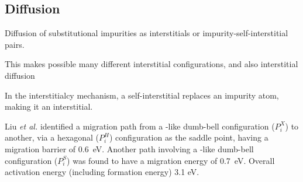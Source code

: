\documentclass[11pt,bibliography=totoc,index=totoc]{scrbook}   %
\begin{document}






%
\subsection{Diffusion}\label{sec:PDiffusion}
%

Diffusion of substitutional impurities as interstitials or impurity-self-interstitial pairs.

This makes possible many different interstitial configurations, and also interstitial diffusion

In the interstitialcy mechanism, a self-interstitial  replaces an impurity atom, making it an interstitial.

Liu \textit{et al.} identified a migration path from a -like dumb-bell configuration ($P_i^X$) to another, via a hexagonal ($P_i^H$) configuration as the saddle point, having a migration barrier of 0.6~eV.\cite{Liu:2003}
Another path involving a -like dumb-bell configuration ($P_i^S$) was found to have a migration energy of 0.7~eV. Overall activation energy (including formation energy) 3.1 eV.
\end{document}
